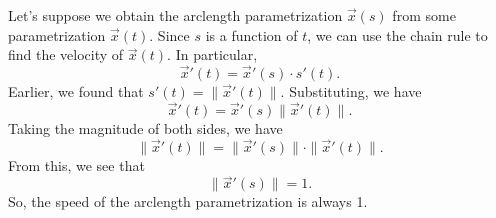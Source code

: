 \documentclass{ximera}
\begin{document}
Let's suppose we obtain the arclength parametrization $\vec{x}(s)$ from some parametrization $\vec{x}(t)$. Since $s$ is a function of $t$, we can use the chain rule to find the velocity of $\vec{x}(t)$. In particular,
\[
\vec{x}'(t) = \vec{x}'(s)\cdot s'(t).
\]
Earlier, we found that $s'(t) = \|\vec{x}'(t)\|$. Substituting, we have
\[
\vec{x}'(t) = \vec{x}'(s)\|\vec{x}'(t)\|.
\]
Taking the magnitude of both sides, we have
\[
\|\vec{x}'(t)\| = \|\vec{x}'(s)\|\cdot \|\vec{x}'(t)\|.
\]
From this, we see that
\[
\|\vec{x}'(s)\| = 1.
\]
So, the speed of the arclength parametrization is always 1.
\end{document}
